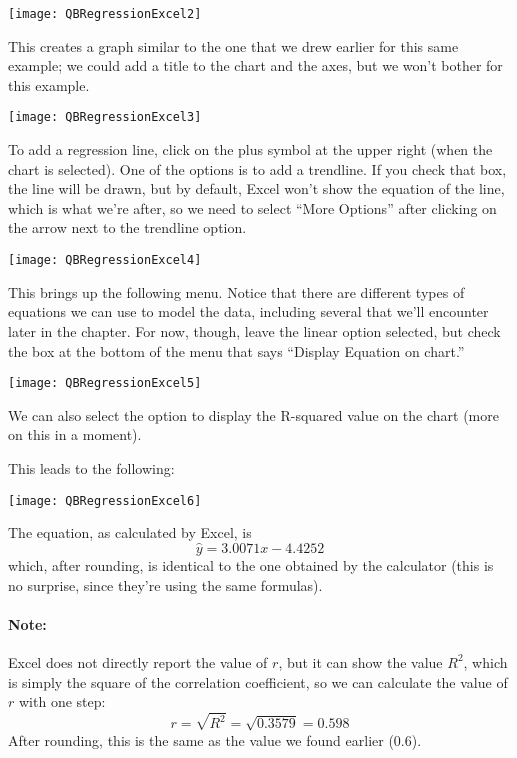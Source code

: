 \begin{center}
\texttt{[image: QBRegressionExcel2]}
\end{center}

This creates a graph similar to the one that we drew earlier for this same example; we could add a title to the chart and the axes, but we won't bother for this example.

\begin{center}
\texttt{[image: QBRegressionExcel3]}
\end{center}

To add a regression line, click on the plus symbol at the upper right (when the chart is selected).  One of the options is to add a trendline.  If you check that box, the line will be drawn, but by default, Excel won't show the equation of the line, which is what we're after, so we need to select ``More Options'' after clicking on the arrow next to the trendline option.

\begin{center}
\texttt{[image: QBRegressionExcel4]}
\end{center}

This brings up the following menu.  Notice that there are different types of equations we can use to model the data, including several that we'll encounter later in the chapter.  For now, though, leave the linear option selected, but check the box at the bottom of the menu that says ``Display Equation on chart.''

\begin{center}
\texttt{[image: QBRegressionExcel5]}
\end{center}

We can also select the option to display the R-squared value on the chart (more on this in a moment).
\pagebreak

This leads to the following:

\begin{center}
\texttt{[image: QBRegressionExcel6]}
\end{center}

The equation, as calculated by Excel, is \[\hat{y} = 3.0071x - 4.4252\] which, after rounding, is identical to the one obtained by the calculator (this is no surprise, since they're using the same formulas).

\paragraph{Note:} Excel does not directly report the value of $r$, but it can show the value $R^2$, which is simply the square of the correlation coefficient, so we can calculate the value of $r$ with one step:
\[r = \sqrt{R^2} = \sqrt{0.3579} = \boxed{0.598}\]
After rounding, this is the same as the value we found earlier (0.6).